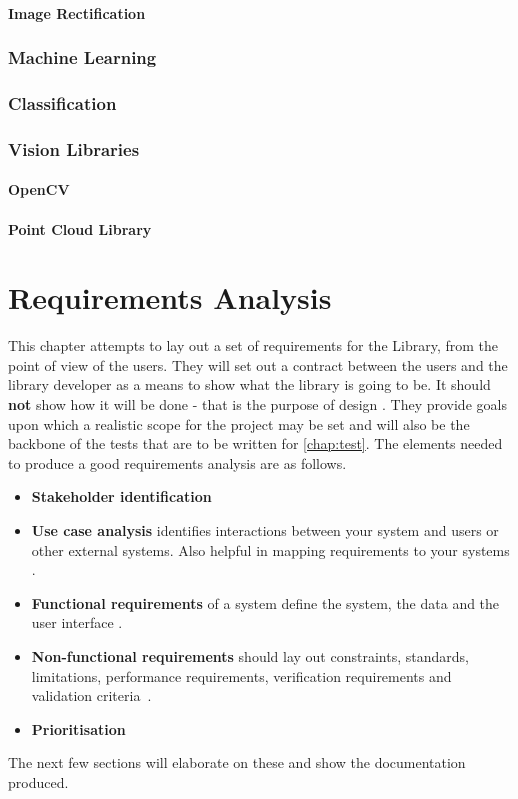 \documentclass[11pt,oneside]{report}
\begin{document}
				\subsubsection{Image Rectification}
				
				
				
			\subsection{Machine Learning}%
			\subsection{Classification}
			\subsection{Vision Libraries}
				\subsubsection{OpenCV}
				\subsubsection{Point Cloud Library}
				
	\chapter{Requirements Analysis}\label{chap:req}
	This chapter attempts to lay out a set of requirements for the Library, from the point of view of the users.
	They will set out a contract between the users and the library developer as a means to show what the library is going to be. It should \textbf{not} show how it will be done - that is the purpose of design \cite{book:dawson}.
	They provide goals upon which a realistic scope for the project may be set and will also be the backbone of the tests that are to be written for \autoref{chap:test}.
	The elements needed to produce a good requirements analysis are as follows.
	\begin{itemize}
		\item \textbf{Stakeholder identification}
		\item \textbf{Use case analysis} identifies interactions between your system and users or other external systems. Also helpful in mapping requirements to your systems \cite{book:uml}.
		\item \textbf{Functional requirements} of a system define the system, the data and the user interface \cite{book:dawson}.
		\item \textbf{Non-functional requirements} should lay out constraints, standards, limitations, performance requirements, verification requirements and validation criteria~\cite{book:dawson}.
		\item \textbf{Prioritisation}
	\end{itemize}
	The next few sections will elaborate on these and show the documentation produced. 
\end{document}

